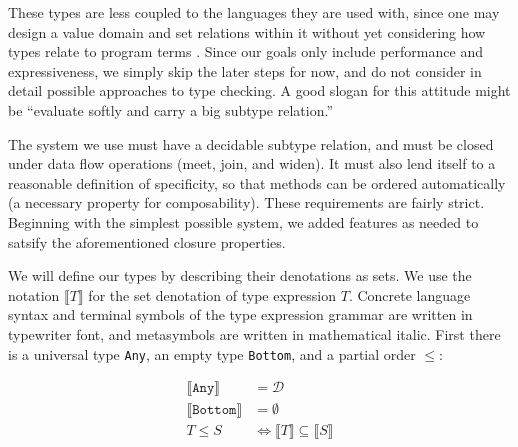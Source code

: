 These types
are less coupled to the languages they are used with, since one may design
a value domain and set relations within it without yet considering how types
relate to program terms \cite{1029823, Castagna:2005:GIS:1069774.1069793}.
Since our goals only include
performance and expressiveness, we simply skip the later steps for now, and do
not consider in detail possible approaches to type checking.
A good slogan for this attitude might be ``evaluate softly and carry a big
subtype relation.''


The system we use
must have a decidable subtype relation, and must be closed under data flow operations
(meet, join, and widen).
It must also lend itself to a reasonable definition of
specificity, so that methods can be ordered automatically (a necessary property for
composability).
These requirements are fairly strict.
Beginning with the simplest possible system, we added features as
needed to satsify the aforementioned closure properties.

We will define our types by describing their denotations as sets.
We use the notation $\llbracket T \rrbracket$ for the set denotation of
type expression $T$.
Concrete language syntax and terminal symbols of the type expression grammar
are written in typewriter font, and metasymbols are written in mathematical italic.
First there is a universal type \texttt{Any}, an empty type \texttt{Bottom}, and
a partial order $\leq$:

\vspace{-3ex}
\begin{align*}
  \llbracket \texttt{Any} \rrbracket &= \mathcal{D} \\
  \llbracket \texttt{Bottom} \rrbracket &= \emptyset \\
  T \leq S &\Leftrightarrow \llbracket T \rrbracket \subseteq \llbracket S \rrbracket
\end{align*}

